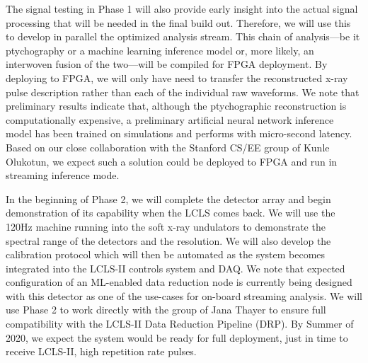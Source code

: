 The signal testing in Phase 1 will also provide early insight into the actual signal processing that will be needed in the final build out.  
Therefore, we will use this to develop in parallel the optimized analysis stream.  
This chain of analysis—be it ptychography or a machine learning inference model or, more likely, an interwoven fusion of the two—will be compiled for FPGA deployment.  
By deploying to FPGA, we will only have need to transfer the reconstructed x-ray pulse description rather than each of the individual raw waveforms. 
We note that preliminary results indicate that, although the ptychographic reconstruction is computationally expensive, a preliminary artificial neural network inference model has been trained on simulations and performs with micro-second latency.  
Based on our close collaboration with the Stanford CS/EE group of Kunle Olukotun, we expect such a solution could be deployed to FPGA and run in streaming inference mode.

In the beginning of Phase 2, we will complete the detector array and begin demonstration of its capability when the LCLS comes back.  
We will use the 120Hz machine running into the soft x-ray undulators to demonstrate the spectral range of the detectors and the resolution.  
We will also develop the calibration protocol which will then be automated as the system becomes integrated into the LCLS-II controls system and DAQ.  
We note that expected configuration of an ML-enabled data reduction node is currently being designed with this detector as one of the use-cases for on-board streaming analysis.  
We will use Phase 2 to work directly with the group of Jana Thayer to ensure full compatibility with the LCLS-II Data Reduction Pipeline (DRP).  
By Summer of 2020, we expect the system would be ready for full deployment, just in time to receive LCLS-II, high repetition rate pulses.

